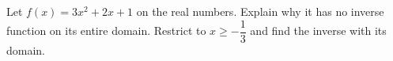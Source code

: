 Let $f(x)=3x^2+2x+1$ on the real numbers. Explain why it has no inverse function on its entire domain. Restrict to $x\ge-\dfrac{1}{3}$ and find the inverse with its domain.
